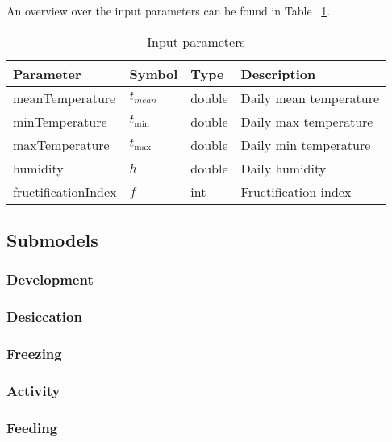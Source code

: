 \documentclass[a4paper, 11pt]{scrartcl}
\begin{document}
An overview over the input parameters can be found in Table ~\ref{input_parameters}.

\begin{table}[h!]
\caption{Input parameters}
\label{input_parameters}
\begin{tabularx}{\textwidth}{llll}
\toprule
\textbf{Parameter} & \textbf{Symbol} & \textbf{Type}     & \textbf{Description}       \\
\midrule
meanTemperature    & $t_{mean}$      & double            & Daily mean temperature     \\
minTemperature     & $t_{\min}$       & double            & Daily max temperature      \\
maxTemperature     & $t_{\max}$       & double            & Daily min temperature      \\
humidity           & $h$             & double            & Daily humidity             \\
\midrule
fructificationIndex & $f$            & int               & Fructification index       \\
\bottomrule
\end{tabularx}
\end{table}


\subsection{Submodels}

\subsubsection{Development}

\subsubsection{Desiccation}

\subsubsection{Freezing}

\subsubsection{Activity}

\subsubsection{Feeding}
\end{document}
